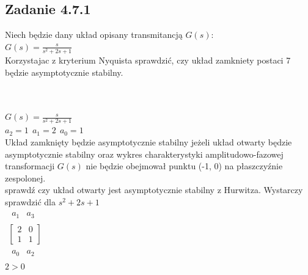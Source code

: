 \pagebreak
\subsection*{Zadanie 4.7.1} {\color{darkgray}
	Niech będzie dany układ opisany transmitancją $G(s)$:\\
	$G(s)=\frac{s}{s^2+2s+1}$\\
	Korzystajac z kryterium Nyquista sprawdzić, czy układ zamkniety postaci 7 będzie asymptotycznie stabilny.
\begin{figure}[!h]
\end{figure}

}\lineh
\\\\
$G(s)=\frac{s}{s^2+2s+1}$\\
$a_2=1 \ \ a_1 =2 \ \ a_0 = 1$\\
Układ zamknięty będzie asymptotycznie stabilny jeżeli układ otwarty będzie asymptotycznie stabilny oraz wykres charakterystyki amplitudowo-fazowej transformacji $G(s)$ nie będzie obejmował punktu (-1, 0) na płaszczyźnie zespolonej.\\
sprawdź czy układ otwarty jest asymptotycznie stabilny z Hurwitza. Wystarczy sprawdzić dla $s^2+2s+1$\\
$
\begin{array}{c}
\begin{array}{cc}a_1 & a_3\end{array}\\
\left[\begin{array}{cc}2&0\\1&1\end{array}\right]\\
\begin{array}{cc}a_0&a_2\end{array}
\end{array}
$\\
$2>0$\\
